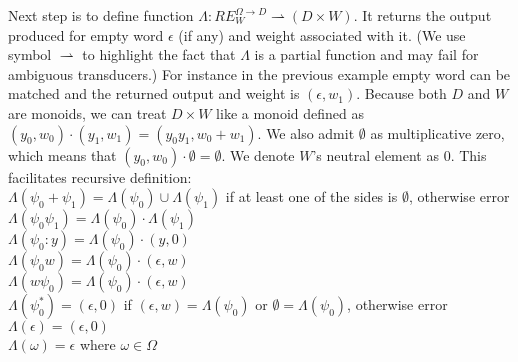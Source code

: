 \documentclass[journal]{journal}
\begin{document}
Next step is to define function $\Lambda:RE_W^{\Omega\rightarrow D} \rightharpoonup ( D \times W)$. It returns the output produced for empty word $\epsilon$ (if any) and weight associated with it. (We use symbol $\rightharpoonup$ to highlight the fact that $\Lambda$ is a partial function and may fail for ambiguous transducers.) For instance in the previous example empty word can be matched and the returned output and weight is $(\epsilon,w_1)$. Because both $D$ and $W$ are monoids, we can treat $D \times W$ like a monoid defined as $(y_0,w_0)\cdot(y_1,w_1) = (y_0y_1,w_0+w_1)$. We also admit $\emptyset$ as multiplicative zero, which means that $(y_0,w_0)\cdot\emptyset=\emptyset$. We denote  $W$'s neutral element as $0$. This facilitates recursive definition: \\
$\Lambda(\psi_0+\psi_1) = \Lambda(\psi_0) \cup \Lambda(\psi_1)$ if at least one of the sides is $\emptyset$, otherwise error\\
$\Lambda(\psi_0\psi_1) =\Lambda(\psi_0) \cdot \Lambda(\psi_1)$ \\
$\Lambda(\psi_0 : y) = \Lambda(\psi_0) \cdot (y,0)$ \\
$\Lambda(\psi_0 w) = \Lambda(\psi_0) \cdot (\epsilon,w)$\\
$\Lambda(w \psi_0 ) =  \Lambda(\psi_0) \cdot (\epsilon,w)$ \\
$\Lambda(\psi_0^* ) = (\epsilon,0)$ if $(\epsilon,w) = \Lambda(\psi_0) $ or $\emptyset = \Lambda(\psi_0) $, otherwise error \\
$\Lambda(\epsilon) = (\epsilon,0)$\\
$\Lambda(\omega) = \epsilon$ where $\omega\in\Omega$
\end{document}
